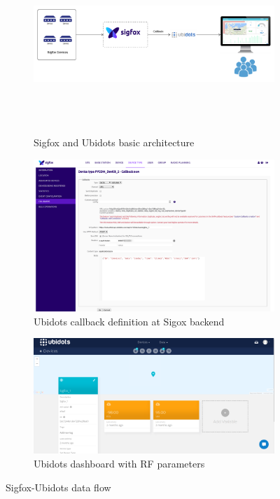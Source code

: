 \documentclass[12pt]{article}
\begin{document}
\begin{figure}[H]
  \begin{subfigure}[h]{\columnwidth}
  \centering
    \includegraphics[width=0.8\columnwidth,height= 6cm,keepaspectratio]{Images/sigfox-ubidotsArchitecture.pdf}
    \label{fig:Sigfox and Ubidots basic architecture}
    \caption{Sigfox and Ubidots basic architecture}
\end{subfigure}
  
  \begin{subfigure}[t]{\columnwidth}
\centering
    \includegraphics[trim=0.5cm 6cm 1cm 0cm,clip=true,width=0.8\columnwidth,totalheight=6cm,keepaspectratio ]{Images/SigfoxUbidotsCallback.pdf}
    \caption{Ubidots callback definition at Sigox backend}
  \end{subfigure}
  
  
  \begin{subfigure}[t]{\columnwidth}
\centering
    \includegraphics[trim=0.5cm 1cm 2cm 0cm,clip=true,width=0.8\columnwidth,totalheight=6cm,keepaspectratio ]{Images/UbidotsDashboard.pdf}
    \caption{Ubidots dashboard with RF parameters}
  \end{subfigure}
  
    \caption{Sigfox-Ubidots data flow}
    \label{fig:Sigfox-Ubidots data flow}
\end{figure}
\end{document}
